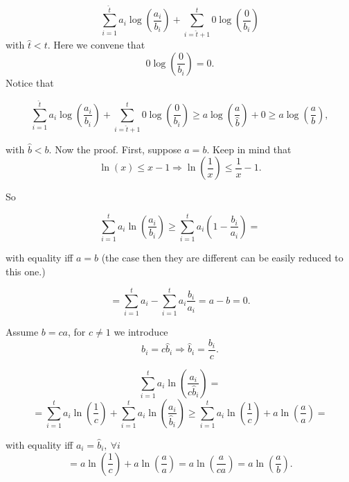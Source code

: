 \[
  \sum_{i= 1}^{\hat{t}}a_i\log\left(\dfrac{a_i}{b_i}\right)+ \sum_{i=\hat{t} + 1}^t 0\log\left(\dfrac{0}{b_i}\right)
 \]
 with $\hat{t} < t$. Here we convene that $$0\log\left(\dfrac{0}{b_i}\right) = 0.$$ Notice that 
 
\[
\sum_{i= 1}^{\hat{t}}a_i\log\left(\dfrac{a_i}{b_i}\right)+ \sum_{i=\hat{t} + 1}^t 0\log\left(\dfrac{0}{b_i}\right) \geq a\log\left(\dfrac{a}{\hat{b}}\right) + 0 \geq a\log\left(\dfrac{a}{b}\right),
\]

with $\hat{b} < b$. Now the proof. First, suppose $a=b$. Keep in mind that $$\ln(x)\leq x - 1\Rightarrow \ln\left(\dfrac{1}{x}\right)\leq \dfrac{1}{x} - 1.$$

So

\[
\sum_{i=1}^ta_i\ln\left(\dfrac{a_i}{b_i}\right) \geq \sum_{i=1}^ta_i\left(1-\dfrac{b_i}{a_i}\right) =  
\]

with equality iff $a=b$ (the case then they are different can be easily reduced to this one.)

\[
= \sum_{i = 1}^ta_i - \sum_{i=1}^ta_i\dfrac{b_i}{a_i} = a -b = 0.
\]

Assume $b = ca$, for $c \not=1$ we introduce $$b_i = c\hat{b}_i \Rightarrow \hat{b}_i = \dfrac{b_i}{c}.$$

\[
\sum_{i = 1}^t a_i\ln\left(\dfrac{a_i}{c\hat{b}_i} \right) = \]
\[ = \sum_{i=1}^{t}a_i\ln\left(\dfrac{1}{c} \right) + \sum_{i=1}^ta_i\ln\left(\dfrac{a_i}{\hat{b}_i} \right) \geq  \sum_{i=1}^{t}a_i\ln\left(\dfrac{1}{c} \right) + a\ln\left(\dfrac{a}{a} \right) = \]

with equality iff $a_i = \hat{b}_i,\ \forall i$
\[
 = a\ln\left(\dfrac{1}{c}\right) + a\ln\left(\dfrac{a}{a}\right) = a\ln\left(\dfrac{a}{ca} \right) = a\ln\left(\dfrac{a}{b} \right).
 \]
 

